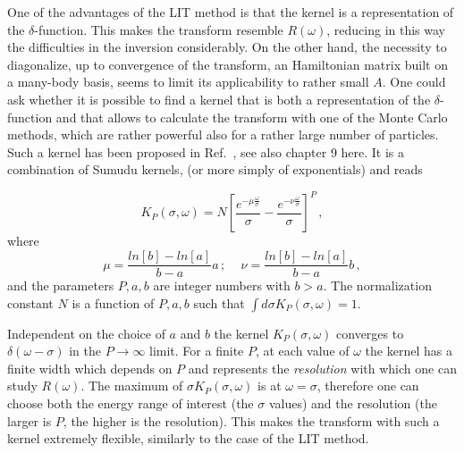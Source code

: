 One of the advantages of the LIT method is that the kernel is a representation of the $\delta$-function. This  makes 
the transform resemble
$R(\omega)$, reducing in this way the difficulties in the inversion considerably. On the other hand, 
the necessity to diagonalize, up to convergence of the transform, 
an Hamiltonian matrix built on a many-body basis, seems to limit its applicability to rather small $A$. One could ask whether it is possible 
to find a kernel that is both a representation of the $\delta$-function and that allows to calculate the transform with one of the 
Monte Carlo methods, which are rather powerful also for a rather large number of particles. 
Such a  kernel has been proposed in Ref.~\cite{Roggero_2013}, see also chapter 9 here. 
It is a combination of Sumudu kernels, (or more simply of exponentials) and reads

\begin{equation}
\label{eq:NEW4}
K_P(\sigma,\omega)=N\left[ \frac{e^{-\mu\frac{\omega}{\sigma}}}{\sigma}-\frac{e^{-\nu\frac{\omega}{\sigma}}}{\sigma} \right]^P\,,
\end{equation}
where 
\begin{equation}
\mu=\frac{ln[b]-ln[a]}{b-a}a\,;\,\,\,\,\,\,\,
\nu=\frac{ln[b]-ln[a]}{b-a}b\,,
\end{equation}
and the parameters $P,a,b$ are integer numbers  with $b>a$. The normalization constant $N$ is a function of $P,a,b$
such that $\int d\sigma K_P(\sigma,\omega)=1$.

Independent on the choice of $a$ and $b$ the kernel $K_P(\sigma,\omega)$ converges to 
$\delta(\omega-\sigma)$ in the $P \to \infty$ limit. 
For a finite $P$, at each value of $\omega$ the kernel has a 
finite width which depends on $P$ and  represents the {\it resolution} with which one can study
$R(\omega)$. The maximum of $\sigma K_P(\sigma,\omega)$ is at $\omega=\sigma$, 
therefore one can choose both the energy range 
of interest (the $\sigma$ values) and the resolution (the larger is $P$, the  higher is the resolution). 
This makes the transform with such a kernel  extremely flexible, similarly to the case of the LIT method.

